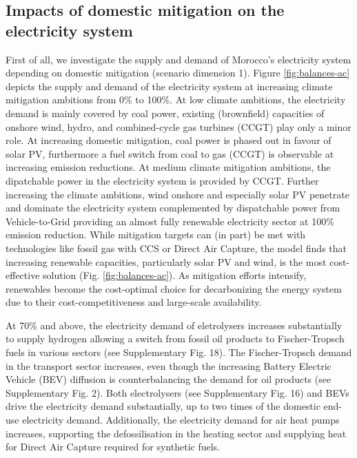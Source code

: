 



\subsection*{Impacts of domestic \co mitigation on the electricity system}
\label{subsec:increase_limit}
First of all, we investigate the supply and demand of Morocco's electricity system depending on domestic \co mitigation (scenario dimension 1). Figure \ref{fig:balances-ac} depicts the supply and demand of the electricity system at increasing climate mitigation ambitions from 0\% to 100\%. At low climate ambitions, the electricity demand is mainly covered by coal power, existing (brownfield) capacities of onshore wind, hydro, and combined-cycle gas turbines (CCGT) play only a minor role. 
At increasing domestic \co mitigation, coal power is phased out in favour of solar PV, furthermore a fuel switch from coal to gas (CCGT) is observable at increasing emission reductions. At medium climate mitigation ambitions, the dipatchable power in the electricity system is provided by CCGT. 
Further increasing the climate ambitions, wind onshore and especially solar PV penetrate and dominate the electricity system complemented by dispatchable power from Vehicle-to-Grid providing an almost fully renewable electricity sector at 100\% emission reduction. 
While mitigation targets can (in part) be met with technologies like fossil gas with CCS or Direct Air Capture, the model finds that increasing renewable capacities, particularly solar PV and wind, is the most cost-effective solution (Fig. \ref{fig:balances-ac}). As mitigation efforts intensify, renewables become the cost-optimal choice for decarbonizing the energy system due to their cost-competitiveness and large-scale availability.

At 70\% and above, the electricity demand of eletrolysers increases substantially to supply hydrogen allowing a switch from fossil oil products to Fischer-Tropsch fuels in various sectors (see Supplementary Fig. 18). %
The Fischer-Tropsch demand in the transport sector increases, even though the increasing Battery Electric Vehicle (BEV) diffusion is counterbalancing the demand for oil products (see Supplementary Fig. 2). %
Both electrolysers (see Supplementary Fig. 16) and BEVs drive the electricity demand substantially, up to two times of the domestic end-use electricity demand. %
Additionally, the electricity demand for air heat pumps increases, supporting the defossilisation in the heating sector and supplying heat for Direct Air Capture required for synthetic fuels.


